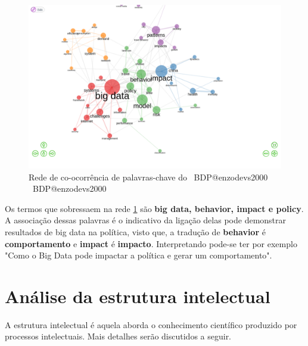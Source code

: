  \begin{figure}[H]
    \centering
    \includegraphics[width=1\textwidth]{experiments/enzodevs2000/AnaliseBibliometrica/BigDataInPolicy/Figures/Graficos/NovoDataset/Conceitual/conceptual_network.png}
    \caption{Rede de co-ocorrência de palavras-chave do \dataset\ BDP@enzodevs2000
    \dataset\ BDP@enzodevs2000}
    \label{fig:enzodevs2000:BDP:newdataset:conceitual:network}
\end{figure}

Os termos que sobressaem na rede \ref{fig:enzodevs2000:BDP:newdataset:conceitual:network} são \textbf{big data, behavior, impact e policy}. A associação dessas palavras é o indicativo da ligação delas pode demonstrar resultados de big data na política, visto que, a tradução de \textbf{behavior} é \textbf{comportamento} e \textbf{impact} é \textbf{impacto}. Interpretando pode-se ter por exemplo "Como o Big Data pode impactar a política e gerar um comportamento".

\section{Análise da estrutura intelectual}
 A estrutura intelectual é aquela aborda o conhecimento científico produzido por processos intelectuais. Mais detalhes serão discutidos a seguir.
 
